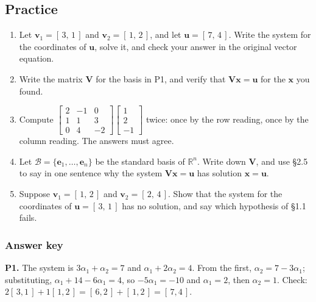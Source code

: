\documentclass[11pt]{article}
\theoremstyle{plain}
\theoremstyle{definition}
\theoremstyle{remark}
\newcommand{\R}{\mathbb{R}}
\newcommand{\vc}[1]{\mathbf{#1}}        %
\newcommand{\mt}[1]{\mathbf{#1}}        %
\newcommand{\bas}{\mathcal{B}}
\begin{document}
\subsection{Practice}
\begin{enumerate}[label=\textbf{P\arabic*.},leftmargin=2.6em,itemsep=5pt]
  \item Let $\vc{v}_1=[\,3,\,1\,]$ and $\vc{v}_2=[\,1,\,2\,]$, and let
        $\vc{u}=[\,7,\,4\,]$. Write the system for the coordinates of $\vc{u}$,
        solve it, and check your answer in the original vector equation.
  \item Write the matrix $\mt{V}$ for the basis in P1, and verify that
        $\mt{V}\vc{x}=\vc{u}$ for the $\vc{x}$ you found.
  \item Compute
        $\begin{bmatrix} 2 & -1 & 0 \\ 1 & 1 & 3 \\ 0 & 4 & -2 \end{bmatrix}
         \begin{bmatrix} 1 \\ 2 \\ -1 \end{bmatrix}$
        twice: once by the row reading, once by the column reading. The answers
        must agree.
  \item Let $\bas=\{\vc{e}_1,\dots,\vc{e}_n\}$ be the standard basis of
        $\R^{n}$. Write down $\mt{V}$, and use \S2.5 to say in one sentence why
        the system $\mt{V}\vc{x}=\vc{u}$ has solution $\vc{x}=\vc{u}$.
  \item Suppose $\vc{v}_1=[\,1,\,2\,]$ and $\vc{v}_2=[\,2,\,4\,]$. Show that the
        system for the coordinates of $\vc{u}=[\,3,\,1\,]$ has no solution, and
        say which hypothesis of \S1.1 fails.
\end{enumerate}

\subsubsection*{Answer key}

\noindent\textbf{P1.} The system is $3\alpha_1+\alpha_2=7$ and
$\alpha_1+2\alpha_2=4$. From the first, $\alpha_2=7-3\alpha_1$; substituting,
$\alpha_1+14-6\alpha_1=4$, so $-5\alpha_1=-10$ and $\alpha_1=2$, then
$\alpha_2=1$. Check: $2[\,3,1\,]+1[\,1,2\,]=[\,6,2\,]+[\,1,2\,]=[\,7,4\,]$.
\checkmark
\end{document}
